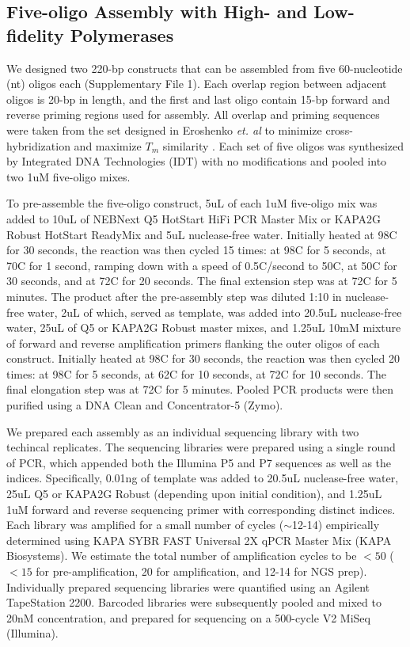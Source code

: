 \documentclass[twocolumn]{article}
\begin{document}
\subsection*{Five-oligo Assembly with High- and Low-fidelity Polymerases}
We designed two 220-bp constructs that can be assembled from five 60-nucleotide (nt) oligos each (Supplementary File 1). Each overlap region between adjacent oligos is 20-bp in length, and the first and last oligo contain 15-bp forward and reverse priming regions used for assembly. All overlap and priming sequences were taken from the set designed in Eroshenko \textit{et. al} to minimize cross-hybridization and maximize $T_m$ similarity \cite{eroshenko2009}. Each set of five oligos was synthesized by Integrated DNA Technologies (IDT) with no modifications and pooled into two 1uM five-oligo mixes.

To pre-assemble the five-oligo construct, 5uL of each 1uM five-oligo mix was added to 10uL of NEBNext Q5 HotStart HiFi PCR Master Mix or KAPA2G Robust HotStart ReadyMix and 5uL nuclease-free water. Initially heated at 98C for 30 seconds, the reaction was then cycled 15 times: at 98C for 5 seconds, at 70C for 1 second, ramping down with a speed of 0.5C/second to 50C, at 50C for 30 seconds, and at 72C for 20 seconds. The final extension step was at 72C for 5 minutes. The product after the pre-assembly step was diluted 1:10 in nuclease-free water, 2uL of which, served as template, was added into 20.5uL nuclease-free water, 25uL of Q5 or KAPA2G Robust master mixes, and 1.25uL 10mM mixture of forward  and reverse amplification primers flanking the outer oligos of each construct. Initially heated at 98C for 30 seconds, the reaction was then cycled 20 times: at 98C for 5 seconds, at 62C for 10 seconds, at 72C for 10 seconds. The final elongation step was at 72C for 5 minutes. Pooled PCR products were then  purified using a DNA Clean and Concentrator-5 (Zymo).

We prepared each assembly as an individual sequencing library with two techincal replicates. The sequencing libraries were prepared using a single round of PCR, which appended both the Illumina P5 and P7 sequences as well as the indices. Specifically, 0.01ng of template was added to 20.5uL nuclease-free water, 25uL Q5 or KAPA2G Robust (depending upon initial condition), and 1.25uL 1uM  forward and reverse sequencing primer with corresponding distinct indices. Each library was amplified for a small number of cycles ($\sim$12-14) empirically determined using KAPA SYBR FAST Universal 2X qPCR Master Mix (KAPA Biosystems). We estimate the total number of amplification cycles to be $<50$ ($<15$ for pre-amplification, 20 for amplification, and 12-14 for NGS prep). Individually prepared sequencing libraries were quantified using an Agilent TapeStation 2200. Barcoded libraries were subsequently pooled and mixed to 20nM concentration, and prepared for sequencing on a 500-cycle V2 MiSeq (Illumina).
\end{document}

